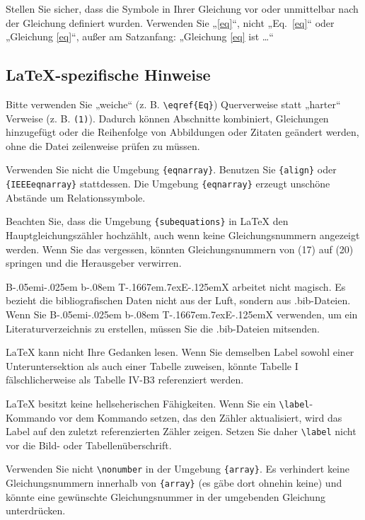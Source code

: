 \documentclass[conference]{IEEEtran}
\def\BibTeX{{\rm B\kern-.05em{\sc i\kern-.025em b}\kern-.08em
    T\kern-.1667em\lower.7ex\hbox{E}\kern-.125emX}}
\begin{document}
Stellen Sie sicher, dass die
Symbole in Ihrer Gleichung vor oder unmittelbar nach der Gleichung definiert wurden. Verwenden Sie „\eqref{eq}“, nicht „Eq.~\eqref{eq}“ oder „Gleichung \eqref{eq}“, außer am
Satzanfang: „Gleichung \eqref{eq} ist …“

\subsection{\LaTeX-spezifische Hinweise}

Bitte verwenden Sie „weiche“ (z. B. \verb|\eqref{Eq}|) Querverweise statt
„harter“ Verweise (z. B. \verb|(1)|). Dadurch können Abschnitte kombiniert,
Gleichungen hinzugefügt oder die Reihenfolge von Abbildungen oder Zitaten geändert werden,
ohne die Datei zeilenweise prüfen zu müssen.

Verwenden Sie nicht die Umgebung \verb|{eqnarray}|. Benutzen Sie
\verb|{align}| oder \verb|{IEEEeqnarray}| stattdessen. Die Umgebung \verb|{eqnarray}|
erzeugt unschöne Abstände um Relationssymbole.

Beachten Sie, dass die Umgebung \verb|{subequations}| in {\LaTeX}
den Hauptgleichungszähler hochzählt, auch wenn keine Gleichungsnummern angezeigt werden.
Wenn Sie das vergessen, könnten Gleichungsnummern von (17) auf (20) springen und
die Herausgeber verwirren.

{\BibTeX} arbeitet nicht magisch. Es bezieht die bibliografischen
Daten nicht aus der Luft, sondern aus .bib-Dateien. Wenn Sie {\BibTeX} verwenden, um ein
Literaturverzeichnis zu erstellen, müssen Sie die .bib-Dateien mitsenden.

{\LaTeX} kann nicht Ihre Gedanken lesen. Wenn Sie demselben Label sowohl einer
Unteruntersektion als auch einer Tabelle zuweisen, könnte Tabelle I
fälschlicherweise als Tabelle IV-B3 referenziert werden.

{\LaTeX} besitzt keine hellseherischen Fähigkeiten. Wenn Sie ein
\verb|\label|-Kommando vor dem Kommando setzen, das den Zähler aktualisiert,
wird das Label auf den zuletzt referenzierten Zähler zeigen. Setzen Sie daher
\verb|\label| nicht vor die Bild- oder Tabellenüberschrift.

Verwenden Sie nicht \verb|\nonumber| in der Umgebung \verb|{array}|.
Es verhindert keine Gleichungsnummern innerhalb von \verb|{array}| (es gäbe dort ohnehin keine)
und könnte eine gewünschte Gleichungsnummer in der umgebenden Gleichung unterdrücken.
\end{document}
